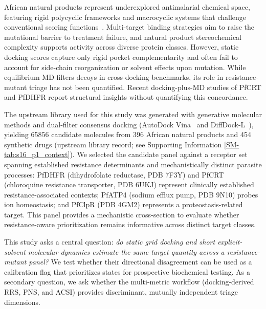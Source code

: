 \documentclass[11pt,a4paper]{article}
\begin{document}
African natural products represent underexplored antimalarial chemical space, featuring rigid polycyclic frameworks and macrocyclic systems that challenge conventional scoring functions~\citep{ferreira2023docking}. Multi-target binding strategies aim to raise the mutational barrier to treatment failure\citep{polypharmacology_malaria_2026}, and natural product stereochemical complexity supports activity across diverse protein classes\citep{polypharmacology_malaria_2026,value_addition_african_np_2025}. However, static docking scores capture only rigid pocket complementarity and often fail to account for side-chain reorganization or solvent effects upon mutation\citep{ferreira2023docking,soares2023mdreport}. While equilibrium MD filters decoys in cross-docking benchmarks\citep{liu2017mdfilter}, its role in resistance-mutant triage has not been quantified. Recent docking-plus-MD studies of PfCRT and PfDHFR report structural insights without quantifying this concordance\citep{ghosh2025pfcrt,gogoi2026np}.

The upstream library used for this study was generated with generative molecular methods and dual-filter consensus docking (AutoDock Vina~\citep{vina_2021} and DiffDock-L~\citep{diffdock_2023}), yielding \num{65856} candidate molecules from 396 African natural products and 454 synthetic drugs (upstream library record; see Supporting Information \cref{SM-tab:s16_p1_context}). We selected the candidate panel against a receptor set spanning established resistance determinants and mechanistically distinct parasite processes: PfDHFR (dihydrofolate reductase, PDB 7F3Y) and PfCRT (chloroquine resistance transporter, PDB 6UKJ) represent clinically established resistance-associated contexts; PfATP4 (sodium efflux pump, PDB 9N10) probes ion homeostasis; and PfClpR (PDB 4GM2) represents a proteostasis-related target. This panel provides a mechanistic cross-section to evaluate whether resistance-aware prioritization remains informative across distinct target classes.

This study asks a central question: \textit{do static grid docking and short explicit-solvent molecular dynamics estimate the same target quantity across a resistance-mutant panel?} We test whether their directional disagreement can be used as a calibration flag that prioritizes states for prospective biochemical testing. As a secondary question, we ask whether the multi-metric workflow (docking-derived RRS, PNS, and ACSI) provides discriminant, mutually independent triage dimensions.
\end{document}
